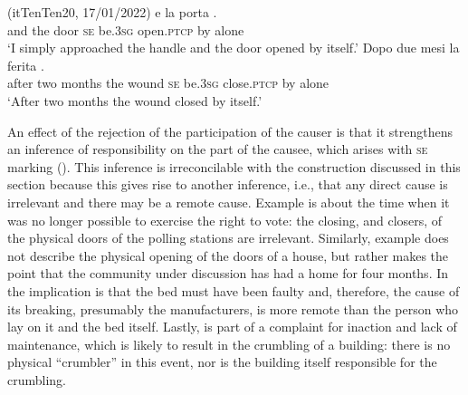 \documentclass[output=paper,colorlinks,citecolor=brown
]{langscibook}
\begin{document}
\hspace*{\fill}(itTenTen20, 17/01/2022)\quad
\ea \label{bentley_example_33}
    \ea \label{bentley_example_33a}
     	e				la		porta														 .	\\
    {} and	the	door		\textsc{se}		be.3\textsc{sg}		open.\textsc{ptcp}	by	alone \\
    \glt 					‘I simply approached the handle and the door opened by itself.’
    \ex \label{bentley_example_33b}
    \gll Dopo		due	mesi			la		ferita			 								 			 . \\
				after			two	months	the	wound		\textsc{se}		be.3\textsc{sg}		close.\textsc{ptcp}	by	alone\\
    \glt 				‘After two months the wound closed by itself.’
    \z
\z

An effect of the rejection of the participation of the causer is that it strengthens an inference of responsibility on the part of the causee, which arises with \textsc{se} marking (\cites[and references therein]{zribi1987reflexivite}[]{kailuweit2012construcciones}[see section  for further discussion]{martin2014anticausatives}). This inference is irreconcilable with the construction discussed in this section because this gives rise to another inference, i.e., that any direct cause is irrelevant and there may be a remote cause. Example  is about the time when it was no longer possible to exercise the right to vote: the closing, and closers, of the physical doors of the polling stations are irrelevant. Similarly, example  does not describe the physical opening of the doors of a house, but rather makes the point that the community under discussion has had a home for four months. In  the implication is that the bed must have been faulty and, therefore, the cause of its breaking, presumably the manufacturers, is more remote than the person who lay on it and the bed itself. Lastly,  is part of a complaint for inaction and lack of maintenance, which is likely to result in the crumbling of a building: there is no physical “crumbler” in this event, nor is the building itself responsible for the crumbling.
\end{document}
